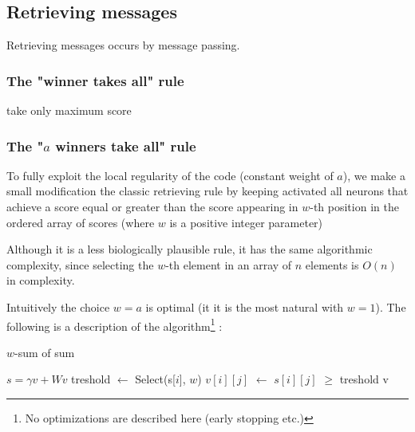 \documentclass[english,11pt,twocolumn]{article}
\renewcommand{\ge}{\geqslant}
\newcommand*\Let[2]{\State #1 $\gets$ #2}
\theoremstyle{definition}
\begin{document}
	\subsection{Retrieving messages}	
		
		Retrieving messages occurs by message passing.		
		
		\subsubsection{The "winner takes all" rule}
		
		take only maximum score
	
		\subsubsection{The "$a$ winners take all" rule}
		

		To fully exploit the local regularity of the code (constant weight of $a$), we make a small modification the classic retrieving rule	by keeping activated all neurons that achieve a score equal or greater than the score appearing in $w$-th position in the ordered array of scores (where $w$ is a positive integer parameter)
		
		
		Although it is a less biologically plausible rule, it has the same algorithmic complexity, since selecting the $w$-th element in an array of $n$ elements is $O(n)$ in complexity.
		
		Intuitively the choice $w = a$ is optimal (it it is the most natural with $w = 1$).
		The following is a description of the algorithm\footnote{No optimizations are described here (early stopping etc.)} :
		\begin{algorithm}
		\caption{$w$-sum of sum \label{asumsum}}
		
		\begin{algorithmic}[1]
		\State $s = \gamma v + W v$
			\Let{treshold}{Select(s[$i$], $w$)} 
			\Let{$v[i][j]$}{$s[i][j]$ $\ge$ treshold}
			\EndFor
		\EndFor
		\EndFor
		\State\Return v
		\EndProcedure
		\end{algorithmic}
		\end{algorithm}
\end{document}
